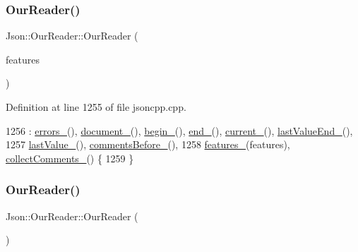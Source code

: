 \subsubsection{\texorpdfstring{Our\+Reader()}{OurReader()}\hspace{0.1cm}{\footnotesize\ttfamily [1/2]}}
{\footnotesize\ttfamily Json\+::\+Our\+Reader\+::\+Our\+Reader (\begin{DoxyParamCaption}\item[{\hyperlink{class_json_1_1_our_features}{Our\+Features} const \&}]{features }\end{DoxyParamCaption})}



Definition at line 1255 of file jsoncpp.\+cpp.


\begin{DoxyCode}
1256     : \hyperlink{class_json_1_1_our_reader_afb76b68ba1ab68fe09cf2838e3d4898d}{errors\_}(), \hyperlink{class_json_1_1_our_reader_a726230af83d22d25e0c76cec3408ecf1}{document\_}(), \hyperlink{class_json_1_1_our_reader_a9bda9d72335d52cd06e65f9eca3f70f5}{begin\_}(), \hyperlink{class_json_1_1_our_reader_ab1f69b0260c27a0d2d65dc56e42c8f9d}{end\_}(), 
      \hyperlink{class_json_1_1_our_reader_a5211fbbba94be80a22dd2317c621efcc}{current\_}(), \hyperlink{class_json_1_1_our_reader_a101eadc45e01c60628b53f0db3d13482}{lastValueEnd\_}(),
1257       \hyperlink{class_json_1_1_our_reader_a9f994b6a2227c5d96e6ed6cbc74ed251}{lastValue\_}(), \hyperlink{class_json_1_1_our_reader_a9c53e77e290eb9081298210a955fda6a}{commentsBefore\_}(),
1258       \hyperlink{class_json_1_1_our_reader_a2714302d5cc54ca2ce4118ea51c0397a}{features\_}(features), \hyperlink{class_json_1_1_our_reader_a259f6ac988da2894bcafc670e42f73ad}{collectComments\_}() \{
1259 \}
\end{DoxyCode}
\mbox{\label{class_json_1_1_our_reader_aee013005522c0d34d2e14962851487ac}} 
\subsubsection{\texorpdfstring{Our\+Reader()}{OurReader()}\hspace{0.1cm}{\footnotesize\ttfamily [2/2]}}
{\footnotesize\ttfamily Json\+::\+Our\+Reader\+::\+Our\+Reader (\begin{DoxyParamCaption}\item[{\hyperlink{class_json_1_1_our_reader}{Our\+Reader} const \&}]{ }\end{DoxyParamCaption})\hspace{0.3cm}{\ttfamily [private]}}



